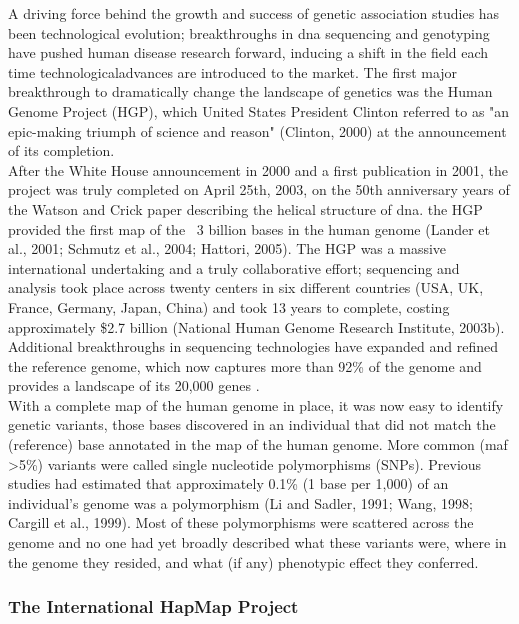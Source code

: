 \cite{lander2001initial}

A driving force behind the growth and success of genetic association studies has been technological evolution; breakthroughs in \gls{dna} sequencing and genotyping have pushed human disease research forward, inducing a shift in the field each time technologicaladvances are introduced to the market. 
The first major breakthrough to dramatically change the landscape of genetics was the Human Genome Project (HGP), which United States President Clinton referred to as "an epic-making triumph of science and reason" (Clinton, 2000) at the announcement of its completion.\\

After the White House announcement in 2000 and a first publication in 2001, the 
project was truly completed on April 25th, 2003, on the 50th anniversary years of the Watson and Crick paper describing the helical structure of \gls{dna}.
the HGP provided the first map of the ~3 billion bases in the human genome (Lander et al., 2001; Schmutz et al., 2004; Hattori, 2005). 
The HGP was a massive international undertaking and a truly collaborative effort; sequencing and analysis took place across twenty centers in six different countries (USA, UK, France, Germany, Japan, China) and took 13 years to complete, costing approximately \$2.7 billion (National Human Genome Research Institute, 2003b).\\ 

Additional breakthroughs in sequencing technologies have expanded and refined the reference genome, which now captures more than 92\% of the genome and provides a landscape of its 20,000 genes \cite{lander2001initial}.\\

With a complete map of the human genome in place, it was now easy to identify genetic variants, those bases discovered in an individual that did not match the (reference) base annotated in the map of the human genome. 
More common (\gls{maf} >5\%) variants were called single nucleotide polymorphisms (SNPs). 
Previous studies had estimated that approximately 0.1\% (1 base per 1,000) of an individual's genome was a polymorphism (Li and Sadler, 1991; Wang, 1998; Cargill et al., 1999). 
Most of these polymorphisms were scattered across the genome and no one had yet broadly described what these variants were, where in the genome they resided, and what (if any) phenotypic effect they conferred.

\subsubsection{The International HapMap Project}

